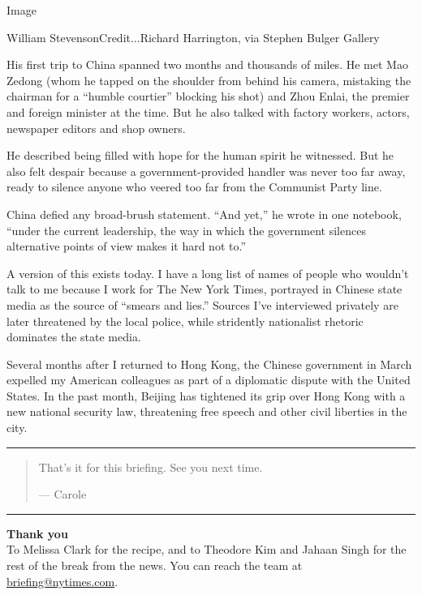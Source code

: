 Image

William StevensonCredit...Richard Harrington, via Stephen Bulger Gallery

His first trip to China spanned two months and thousands of miles. He
met Mao Zedong (whom he tapped on the shoulder from behind his camera,
mistaking the chairman for a ``humble courtier'' blocking his shot) and
Zhou Enlai, the premier and foreign minister at the time. But he also
talked with factory workers, actors, newspaper editors and shop owners.

He described being filled with hope for the human spirit he witnessed.
But he also felt despair because a government-provided handler was never
too far away, ready to silence anyone who veered too far from the
Communist Party line.

China defied any broad-brush statement. ``And yet,'' he wrote in one
notebook, ``under the current leadership, the way in which the
government silences alternative points of view makes it hard not to.''

A version of this exists today. I have a long list of names of people
who wouldn't talk to me because I work for The New York Times, portrayed
in Chinese state media as the source of ``smears and lies.'' Sources
I've interviewed privately are later threatened by the local police,
while stridently nationalist rhetoric dominates the state media.

Several months after I returned to Hong Kong, the Chinese government in
March expelled my American colleagues as part of a diplomatic dispute
with the United States. In the past month, Beijing has tightened its
grip over Hong Kong with a new national security law, threatening free
speech and other civil liberties in the city.

\begin{center}\rule{0.5\linewidth}{\linethickness}\end{center}

\begin{quote}
That's it for this briefing. See you next time.

--- Carole
\end{quote}

\begin{center}\rule{0.5\linewidth}{\linethickness}\end{center}

\textbf{Thank you}\\
To Melissa Clark for the recipe, and to Theodore Kim and Jahaan Singh
for the rest of the break from the news. You can reach the team at
\href{mailto:briefing+pm@nytimes.com?subject=Briefing\%20Feedback}{briefing@nytimes.com}.

